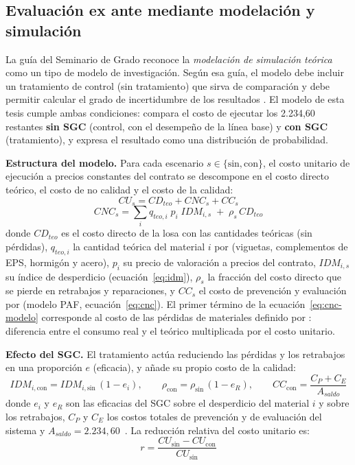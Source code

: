 \subsection{Evaluación ex ante mediante modelación y simulación}
\label{sec:modelo-simulacion}

La guía del Seminario de Grado reconoce la \emph{modelación de simulación teórica} como un tipo de modelo de investigación. Según esa guía, el modelo debe incluir un tratamiento de control (sin tratamiento) que sirva de comparación y debe permitir calcular el grado de incertidumbre de los resultados \parencite{barrios2021modelo}. El modelo de esta tesis cumple ambas condiciones: compara el costo de ejecutar los 2.234,60~\mdos{} restantes \textbf{sin SGC} (control, con el desempeño de la línea base) y \textbf{con SGC} (tratamiento), y expresa el resultado como una distribución de probabilidad.

\textbf{Estructura del modelo.} Para cada escenario $s \in \{\text{sin}, \text{con}\}$, el costo unitario de ejecución a precios constantes del contrato se descompone en el costo directo teórico, el costo de no calidad y el costo de la calidad:
\begin{equation}
  CU_s = CD_{teo} + CNC_s + CC_s
  \label{eq:cu-modelo}
\end{equation}
\begin{equation}
  CNC_s = \sum_{i} q_{teo,i}\; p_i\; IDM_{i,s} \;+\; \rho_s\, CD_{teo}
  \label{eq:cnc-modelo}
\end{equation}
donde $CD_{teo}$ es el costo directo de la losa con las cantidades teóricas (sin pérdidas), $q_{teo,i}$ la cantidad teórica del material $i$ por \mdos{} (viguetas, complementos de EPS, hormigón y acero), $p_i$ su precio de valoración a precios del contrato, $IDM_{i,s}$ su índice de desperdicio (ecuación~\ref{eq:idm}), $\rho_s$ la fracción del costo directo que se pierde en retrabajos y reparaciones, y $CC_s$ el costo de prevención y evaluación por \mdos{} (modelo PAF, ecuación~\ref{eq:cnc}). El primer término de la ecuación~\eqref{eq:cnc-modelo} corresponde al costo de las pérdidas de materiales definido por \textcite{rossi2001}: diferencia entre el consumo real y el teórico multiplicada por el costo unitario.

\textbf{Efecto del SGC.} El tratamiento actúa reduciendo las pérdidas y los retrabajos en una proporción $e$ (eficacia), y añade su propio costo de la calidad:
\begin{equation}
  IDM_{i,\text{con}} = IDM_{i,\text{sin}}\,(1 - e_i), \qquad
  \rho_{\text{con}} = \rho_{\text{sin}}\,(1 - e_R), \qquad
  CC_{\text{con}} = \frac{C_P + C_E}{A_{saldo}}
  \label{eq:efecto-sgc}
\end{equation}
donde $e_i$ y $e_R$ son las eficacias del SGC sobre el desperdicio del material $i$ y sobre los retrabajos, $C_P$ y $C_E$ los costos totales de prevención y de evaluación del sistema y $A_{saldo} = 2.234{,}60$~\mdos{}. La reducción relativa del costo unitario es:
\begin{equation}
  r = \frac{CU_{\text{sin}} - CU_{\text{con}}}{CU_{\text{sin}}}
  \label{eq:r-modelo}
\end{equation}

